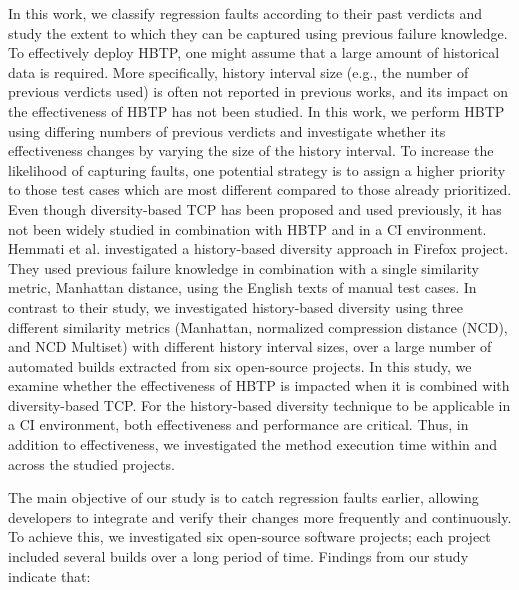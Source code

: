 \documentclass[1p]{elsarticle}
\begin{document}
In this work, we classify regression faults according to their past verdicts and study the extent to which they can be captured using previous failure knowledge. To effectively deploy HBTP, one might assume that a large amount of historical data is required. More specifically, history interval size (e.g., the number of previous verdicts used) is often not reported in previous works, and its impact on the effectiveness of HBTP has not been studied. In this work, we perform HBTP using differing numbers of previous verdicts and investigate whether its effectiveness changes by varying the size of the history interval. To increase the likelihood of capturing faults, one potential strategy is to assign a higher priority to those test cases which are most different compared to those already prioritized. Even though diversity-based TCP has been proposed and used previously, it has not been widely studied in combination with HBTP and in a CI environment. Hemmati et al. \cite{hemmati2017prioritizing} investigated a history-based diversity approach in Firefox project. They used previous failure knowledge in combination with a single similarity metric, Manhattan distance, using the English texts of manual test cases. In contrast to their study, we investigated history-based diversity using three different similarity metrics (Manhattan, normalized compression distance (NCD), and NCD Multiset) with different history interval sizes, over a large number of automated builds extracted from six open-source projects. In this study, we examine whether the effectiveness of HBTP is impacted when it is combined with diversity-based TCP. For the history-based diversity technique to be applicable in a CI environment, both effectiveness and performance are critical. Thus, in addition to effectiveness, we investigated the method execution time within and across the studied projects.
 
The main objective of our study is to catch regression faults earlier, allowing developers to integrate and verify their changes more frequently and continuously. To achieve this, we investigated six open-source software projects; each project included several builds over a long period of time. Findings from our study indicate that:
\end{document}
